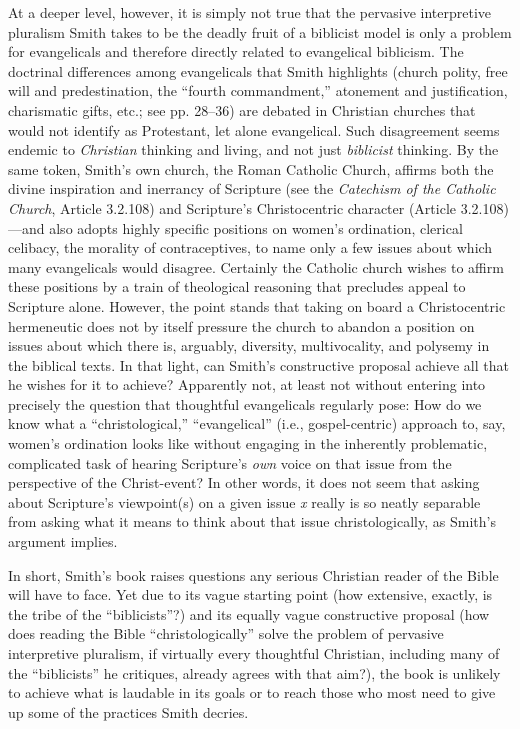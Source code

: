 At a deeper level, however, it is simply not true that the pervasive
interpretive pluralism Smith takes to be the deadly fruit of a biblicist
model is only a problem for evangelicals and therefore directly related
to evangelical biblicism. The doctrinal differences among evangelicals
that Smith highlights (church polity, free will and predestination, the
“fourth commandment,” atonement and justification, charismatic gifts,
etc.; see pp. 28--36) are debated in Christian churches that would not
identify as Protestant, let alone evangelical. Such disagreement seems
endemic to \emph{Christian} thinking and living, and not just \emph{biblicist}
thinking. By the same token, Smith’s own church, the Roman Catholic
Church, affirms both the divine inspiration and inerrancy of Scripture
(see the \emph{Catechism of the Catholic Church}, Article 3.2.108) and
Scripture’s Christocentric character (Article 3.2.108)—and also adopts
highly specific positions on women’s ordination, clerical celibacy, the
morality of contraceptives, to name only a few issues about which many
evangelicals would disagree. Certainly the Catholic church wishes to
affirm these positions by a train of theological reasoning that
precludes appeal to Scripture alone. However, the point stands that
taking on board a Christocentric hermeneutic does not by itself pressure
the church to abandon a position on issues about which there is,
arguably, diversity, multivocality, and polysemy in the biblical texts.
In that light, can Smith’s constructive proposal achieve all that he
wishes for it to achieve? Apparently not, at least not without entering
into precisely the question that thoughtful evangelicals regularly pose:
How do we know what a “christological,” “evangelical” (i.e.,
gospel-centric) approach to, say, women’s ordination looks like without
engaging in the inherently problematic, complicated task of hearing
Scripture’s \emph{own} voice on that issue from the perspective of the
Christ-event? In other words, it does not seem that asking about
Scripture’s viewpoint(s) on a given issue \emph{x} really is so neatly
separable from asking what it means to think about that issue
christologically, as Smith’s argument implies.

In short, Smith’s book raises questions any serious Christian reader of
the Bible will have to face. Yet due to its vague starting point (how
extensive, exactly, is the tribe of the “biblicists”?) and its equally
vague constructive proposal (how does reading the Bible
“christologically” solve the problem of pervasive interpretive
pluralism, if virtually every thoughtful Christian, including many of
the “biblicists” he critiques, already agrees with that aim?), the book
is unlikely to achieve what is laudable in its goals or to reach those
who most need to give up some of the practices Smith decries.

